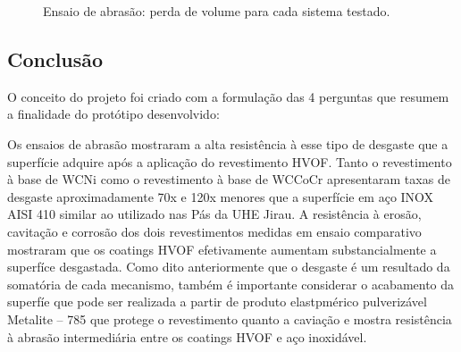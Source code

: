 \begin{figure}[h!]
\centering
{}
\caption{Ensaio de abrasão: perda de volume para cada sistema testado.}
\label{fig:ensaio_abrasao}

\end{figure}


\subsection{Conclusão}
O conceito do projeto foi criado com a formulação das 4 perguntas que resumem a
finalidade do protótipo desenvolvido:


Os ensaios de abrasão mostraram a alta resistência à esse tipo de desgaste que a
superfície adquire após a aplicação do revestimento HVOF.  Tanto o revestimento
à base de WCNi como o revestimento à base de WCCoCr apresentaram taxas de
desgaste aproximadamente 70x e 120x menores que a superfície em aço INOX AISI
410 similar ao utilizado nas Pás da UHE Jirau. A resistência à erosão,
cavitação e corrosão dos dois revestimentos medidas em ensaio comparativo
mostraram que os coatings HVOF efetivamente aumentam substancialmente a
superfíce desgastada. Como dito anteriormente que o desgaste é um resultado da
somatória de cada mecanismo, também é importante considerar o acabamento da
superfíe que pode ser realizada a partir de produto elastpmérico pulverizável
Metalite – 785 que protege o revestimento quanto a caviação e mostra
resistência à abrasão intermediária entre os coatings HVOF e aço inoxidável.

